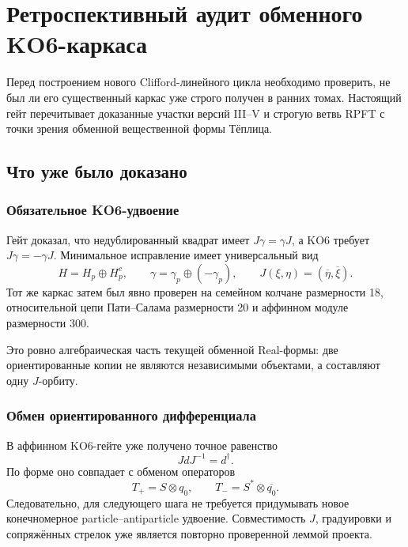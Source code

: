 \chapter{Ретроспективный аудит обменного KO6-каркаса}

Перед построением нового Clifford-линейного цикла необходимо проверить,
не был ли его существенный каркас уже строго получен в ранних томах.
Настоящий гейт перечитывает доказанные участки версий III--V и строгую
ветвь RPFT с точки зрения обменной вещественной формы Тёплица.

\section{Что уже было доказано}

\subsection{Обязательное KO6-удвоение}

Гейт  доказал, что
недублированный квадрат имеет $J\gamma=\gamma J$, а KO6 требует
$J\gamma=-\gamma J$. Минимальное исправление имеет универсальный вид
\begin{equation}
 H=H_p\oplus H_p^c,
 \qquad
 \gamma=\gamma_p\oplus(-\gamma_p),
 \qquad
 J(\xi,\eta)=(\overline\eta,\overline\xi).
 \label{eq:v5-retro-universal-ko6-doubling}
\end{equation}
Тот же каркас затем был явно проверен на семейном колчане размерности 18,
относительной цепи Пати--Салама размерности 20 и аффинном модуле
размерности 300.

Это ровно алгебраическая часть текущей обменной Real-формы: две
ориентированные копии не являются независимыми объектами, а составляют
одну $J$-орбиту.

\subsection{Обмен ориентированного дифференциала}

В аффинном KO6-гейте уже получено точное равенство
\begin{equation}
 JdJ^{-1}=d^\dagger.
 \label{eq:v5-retro-j-d-exchange}
\end{equation}
По форме оно совпадает с обменом операторов
\begin{equation}
 T_+=S\otimes q_0,
 \qquad
 T_-=S^*\otimes\overline{q_0}.
\end{equation}
Следовательно, для следующего шага не требуется придумывать новое
конечномерное particle--antiparticle удвоение. Совместимость $J$,
градуировки и сопряжённых стрелок уже является повторно проверенной леммой
проекта.

